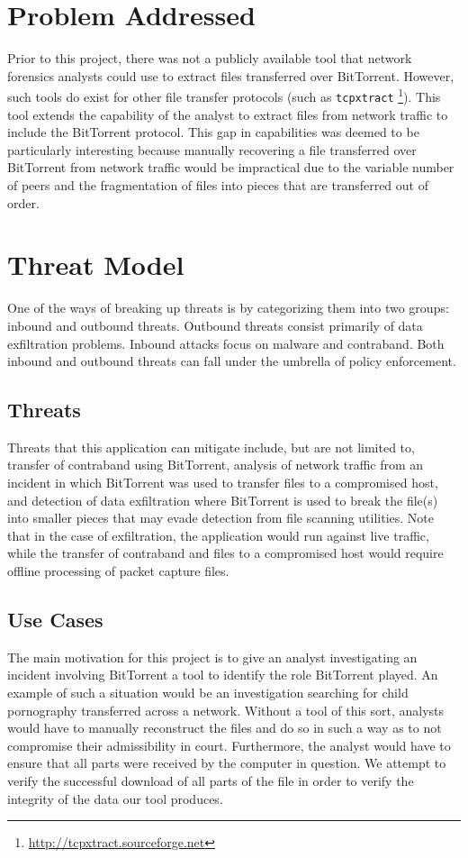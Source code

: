 \documentclass{acm_proc_article-sp}
\begin{document}
\section{Problem Addressed}
Prior to this project, there was not a publicly available tool that network
forensics analysts could use to extract files transferred over BitTorrent.
However, such tools do exist for other file transfer protocols (such as
\texttt{tcpxtract} \footnote{\url{http://tcpxtract.sourceforge.net}}). This
tool extends the capability of the analyst to extract files from network
traffic to include the BitTorrent protocol. This gap in capabilities was deemed
to be particularly interesting because manually recovering a file transferred
over BitTorrent from network traffic would be impractical due to the variable
number of peers and the fragmentation of files into pieces that are transferred
out of order.

\section{Threat Model}
One of the ways of breaking up threats is by categorizing them into two groups:
inbound and outbound threats.  Outbound threats consist primarily of data
exfiltration problems.  Inbound attacks focus on malware and contraband. Both
inbound and outbound threats can fall under the umbrella of policy enforcement.

\subsection{Threats}
Threats that this application can mitigate include, but are not limited to,
transfer of contraband using BitTorrent, analysis of network traffic from an
incident in which BitTorrent was used to transfer files to a compromised host,
and detection of data exfiltration where BitTorrent is used to break the
file(s) into smaller pieces that may evade detection from file scanning
utilities. Note that in the case of exfiltration, the application would run
against live traffic, while the transfer of contraband and files to a
compromised host would require offline processing of packet capture files.


\subsection{Use Cases}
The main motivation for this project is to give an analyst investigating an
incident involving BitTorrent a tool to identify the role BitTorrent played.  An
example of such a situation would be an investigation searching for child
pornography transferred across a network. Without a tool of this sort, analysts
would have to manually reconstruct the files and do so in such a way as to not
compromise their admissibility in court. Furthermore, the analyst would have to
ensure that all parts were received by the computer in question. We attempt to
verify the successful download of all parts of the file in order to verify the
integrity of the data our tool produces.
\end{document}
